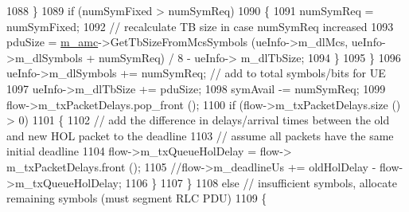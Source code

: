 \begin{DoxyCode}
1088                                                                 \}
1089                                                                 \textcolor{keywordflow}{if} (numSymFixed > numSymReq)
1090                                                                 \{
1091                                                                         numSymReq = numSymFixed;
1092                                                                         \textcolor{comment}{// recalculate TB size in case
       numSymReq increased}
1093                                                                         pduSize = 
      \hyperlink{classns3_1_1MmWaveFlexTtiMaxWeightMacScheduler_a36c22ad89fe5d6743a058f253a43a70d}{m\_amc}->GetTbSizeFromMcsSymbols (ueInfo->m\_dlMcs, ueInfo->m\_dlSymbols + numSymReq) / 8 - ueInfo->
      m\_dlTbSize;
1094                                                                 \}
1095                                                         \}
1096                                                         ueInfo->m\_dlSymbols += numSymReq;               \textcolor{comment}{//
       add to total symbols/bits for UE}
1097                                                         ueInfo->m\_dlTbSize += pduSize;
1098                                                         symAvail -= numSymReq;
1099                                                         flow->m\_txPacketDelays.pop\_front ();
1100                                                         \textcolor{keywordflow}{if} (flow->m\_txPacketDelays.size () > 0)
1101                                                         \{
1102                                                                 \textcolor{comment}{// add the difference in delays/arrival
       times between the old and new HOL packet to the deadline}
1103                                                                 \textcolor{comment}{// assume all packets have the same initial
       deadline}
1104                                                                 flow->m\_txQueueHolDelay = flow->
      m\_txPacketDelays.front ();
1105                                                                 \textcolor{comment}{//flow->m\_deadlineUs += oldHolDelay -
       flow->m\_txQueueHolDelay;}
1106                                                         \}
1107                                                 \}
1108                                                 \textcolor{keywordflow}{else}    \textcolor{comment}{// insufficient symbols, allocate remaining symbols
       (must segment RLC PDU)}
1109                                                 \{

\end{DoxyCode}
